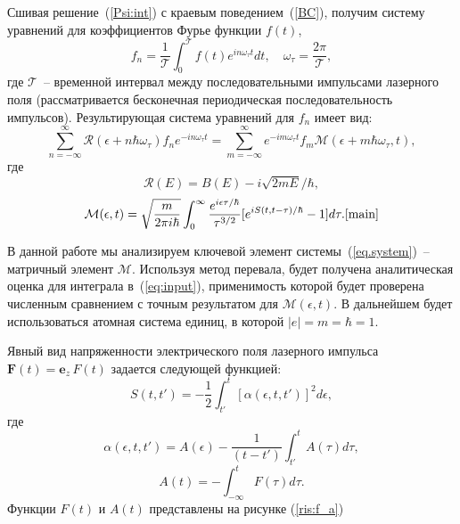 \documentclass[14pt]{article}
\numberwithin{figure}{section}
\numberwithin{equation}{section}
\newcommand{\vF}{\mathbf{F}}
\newcommand{\ve}{\mathbf{e}}
\newcommand{\cR}{\mathcal{R}}
\newcommand{\cM}{\mathcal{M}}
\newcommand{\cT}{\mathcal{T}}
\begin{document}
Сшивая решение~(\ref{Psi:int}) с краевым поведением~(\ref{BC}), получим систему уравнений для коэффициентов Фурье функции $f(t)$, 
\begin{equation}
\label{forier:f}
f_n=\frac{1}{\cT}\int_0^{\cT} f(t) e^{in\omega_\tau t}dt,\quad \omega_\tau = \frac{2\pi}{\cT}, 
\end{equation}
где $\cT$~-- временной интервал между последовательными импульсами лазерного поля (рассматривается бесконечная периодическая последовательность импульсов).\cite{12}
Результирующая система уравнений для $f_n$ имеет вид:
\begin{equation}
\label{eq.system}
\sum_{n=-\infty}^\infty \cR(\epsilon+n\hbar\omega_\tau)f_ne^{-in\omega_\tau t} = \sum_{m=-\infty}^\infty e^{-im\omega_\tau t} f_m \cM(\epsilon+m\hbar\omega_\tau,t),
\end{equation}
где
\begin{equation}
\label{R}
\cR(E) = B(E) - i\sqrt{2mE}/\hbar,
\end{equation}
\begin{equation}
\label{eq:input}
\cM(\epsilon,t) = \sqrt{\frac{m}{2\pi i\hbar}}\int_0^{\infty}
\frac{e^{i\epsilon\tau/\hbar}}{\tau^{3/2}}[e^{iS(t,t-\tau)/\hbar}-1]d\tau. \cite{main}
\end{equation}

В данной работе мы анализируем ключевой элемент системы~(\ref{eq.system})~-- матричный элемент $\cM$. Используя метод перевала, будет получена аналитическая оценка для интеграла в~(\ref{eq:input}), применимость которой будет проверена численным сравнением с точным результатом для $\cM(\epsilon,t)$. В дальнейшем будет использоваться атомная система единиц, в которой $|e|=m=\hbar=1$.

Явный вид напряженности электрического поля лазерного импульса $\vF (t) = \ve_z\,F(t)$ задается следующей функцией:
\begin{equation}\label{eq:s}
S(t, t') = -\frac{1}{2}\int_{t'}^{t} [\alpha(\epsilon, t, t')]^2 d\epsilon,
\end{equation}
где
\begin{equation}\label{eq:alpha}
\alpha(\epsilon, t, t') = A(\epsilon) - \frac{1}{(t-t')}\int_{t'}^{t}A(\tau) d\tau,
\end{equation}
\begin{equation}\label{eq:a}
A(t) = -\int_{-\infty}^{t} F(\tau) d\tau.
\end{equation}
Функции $F(t)$ и $A(t)$ представлены на рисунке (\ref{ris:f_a})
\end{document}
